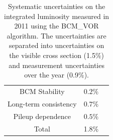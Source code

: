 \begin{table}[htbp]
\begin{tabular}{ccl}
		BCM Stability & $0.2\%$ & \\
		{Long-term consistency} & {$0.7\%$} & \\
		{Pileup dependence} & {$0.5\%$} & \\
		\hline
		\hline
		Total & 1.8\% & \\
		\hline
	\end{tabular}
	\caption{Systematic uncertainties on the integrated luminosity measured in 2011 using the BCM\_VOR algorithm. The uncertainties are separated into uncertainties on the visible cross section (1.5\%) and measurement uncertainties over the year (0.9\%).}
	\label{table:luminosity-uncertainties}
\end{table}

\begin{figure}
	\centering
	\hfill
	\hfill
\end{figure}
